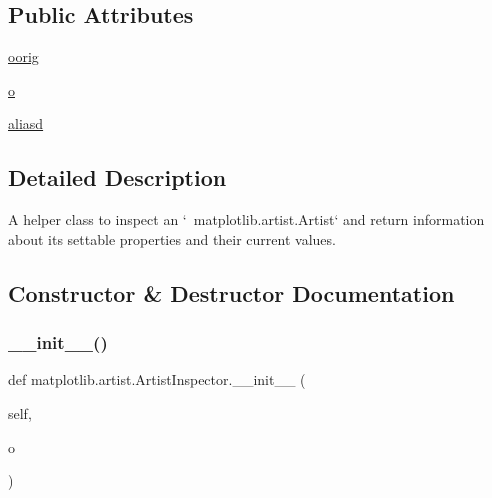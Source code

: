 \subsection*{Public Attributes}
\begin{DoxyCompactItemize}
\item 
\hyperlink{classmatplotlib_1_1artist_1_1ArtistInspector_ae9115c7f39a78b1dfd6164212e36fbbd}{oorig}
\item 
\hyperlink{classmatplotlib_1_1artist_1_1ArtistInspector_afbaadd08e0b528dab9909914d9ea8b90}{o}
\item 
\hyperlink{classmatplotlib_1_1artist_1_1ArtistInspector_a74f52bc094ccbe379ca266e7b401ead1}{aliasd}
\end{DoxyCompactItemize}


\subsection{Detailed Description}
\begin{DoxyVerb}A helper class to inspect an `~matplotlib.artist.Artist` and return
information about its settable properties and their current values.
\end{DoxyVerb}
 

\subsection{Constructor \& Destructor Documentation}
\mbox{\label{classmatplotlib_1_1artist_1_1ArtistInspector_a77b97935c89bb36585a56a2ba3e5b5cc}} 
\subsubsection{\texorpdfstring{\+\_\+\+\_\+init\+\_\+\+\_\+()}{\_\_init\_\_()}}
{\footnotesize\ttfamily def matplotlib.\+artist.\+Artist\+Inspector.\+\_\+\+\_\+init\+\_\+\+\_\+ (\begin{DoxyParamCaption}\item[{}]{self,  }\item[{}]{o }\end{DoxyParamCaption})}

